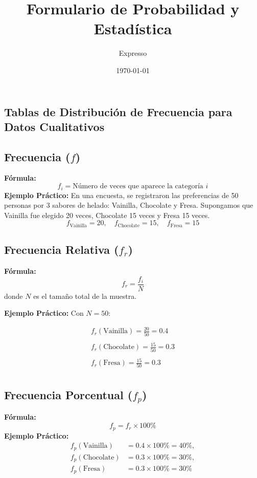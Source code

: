 \documentclass[10pt]{article}
\title{Formulario de Probabilidad y Estadística}
\author{Expresso}
\date{\today}
\begin{document}
	
	\maketitle
	
	\begin{multicols}{2}
		
		\section*{Tablas de Distribución de Frecuencia para Datos Cualitativos}
		
		\subsection*{Frecuencia ($f$)}
		\textbf{Fórmula:}
		\[
		f_i = \text{Número de veces que aparece la categoría } i
		\]
		\textbf{Ejemplo Práctico:}  
		En una encuesta, se registraron las preferencias de 50 personas por 3 sabores de helado: Vainilla, Chocolate y Fresa. Supongamos que Vainilla fue elegido 20 veces, Chocolate 15 veces y Fresa 15 veces.
		\[
		f_{\text{Vainilla}} = 20, \quad f_{\text{Chocolate}} = 15, \quad f_{\text{Fresa}} = 15
		\]
		
		\vspace{0.5cm}
		
		\subsection*{Frecuencia Relativa ($f_r$)}
		\textbf{Fórmula:}
		\[
		f_r = \frac{f_i}{N}
		\]
		donde \( N \) es el tamaño total de la muestra.
		
		\textbf{Ejemplo Práctico:}  
		Con \( N = 50 \):
		
		\begin{align*}
		f_r(\text{Vainilla}) = \frac{20}{50} = 0.4 \\
		\\
		f_r(\text{Chocolate}) = \frac{15}{50} = 0.3 \\
		\\
		f_r(\text{Fresa}) = \frac{15}{50} = 0.3 \\
		\end{align*}
		
		\vspace{0.5cm}
		
		\subsection*{Frecuencia Porcentual ($f_p$)}
		\textbf{Fórmula:}
		\[
		f_p = f_r \times 100\%
		\]
		\textbf{Ejemplo Práctico:}  
		\begin{align*}
			f_p(\text{Vainilla}) &= 0.4 \times 100\% = 40\%, \\
			f_p(\text{Chocolate}) &= 0.3 \times 100\% = 30\%, \\
			f_p(\text{Fresa}) &= 0.3 \times 100\% = 30\%
		\end{align*}


\end{multicols}
\end{document}
